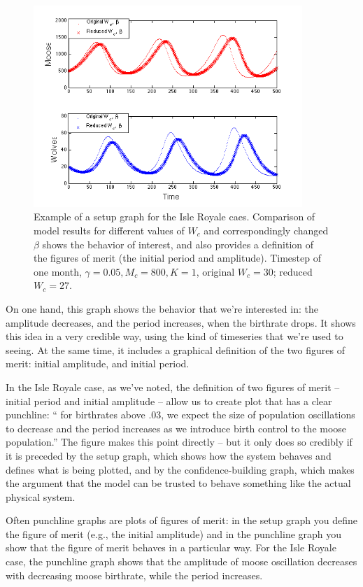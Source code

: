 \begin{figure}[h!]
\includegraphics[width=4in]{figs/MooseBCTimeSeries}
\caption{Example of a setup graph for the Isle Royale caes.  Comparison of model results for different values of  $W_c$ and correspondingly changed 
$\beta$ shows the behavior of interest, and also provides a definition of the figures of merit (the initial period and amplitude).  Timestep of one month,  $\gamma = 0.05, M_c = 800, K=1$, original $W_c = 30$; reduced
$W_c = 27$.}
\end{figure}

On one hand, this graph shows the behavior that we're interested in:  the amplitude decreases, and the period increases, when the birthrate drops.  It shows this idea in a very credible way, using the kind of timeseries that we're used to seeing.  At the same time, it includes a graphical definition of the two figures of merit:  initial amplitude, and initial period.

  In the Isle Royale case, as we've noted, the definition of two figures of merit -- initial period and initial amplitude -- allow us to create plot that has a clear punchline:  `` for birthrates above .03, we expect the size of population oscillations to decrease and the period increases as we introduce birth control to the moose population.''  The figure makes this point directly -- but it only does so credibly if it is preceded by the setup graph, which shows how the system behaves and defines what is being plotted, and by the confidence-building graph, which makes the argument that the model can be trusted to behave something like the actual physical system.

Often punchline graphs are plots of figures of merit:  in the setup graph you define the figure of merit (e.g., the initial amplitude) and in the punchline graph you show that the figure of merit behaves in a particular way.  For the Isle Royale case, the punchline graph shows that the amplitude of moose oscillation decreases with decreasing moose birthrate, while the period increases.

